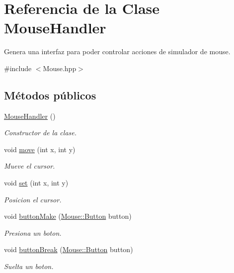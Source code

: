 \hypertarget{class_mouse_handler}{}\section{Referencia de la Clase Mouse\+Handler}
\label{class_mouse_handler}


Genera una interfaz para poder controlar acciones de simulador de mouse.  




{\ttfamily \#include $<$Mouse.\+hpp$>$}

\subsection*{Métodos públicos}
\begin{DoxyCompactItemize}
\item 
\hyperlink{class_mouse_handler_aeafc3781635558115e8188bbb7d976b5}{Mouse\+Handler} ()
\begin{DoxyCompactList}\small\item\em Constructor de la clase. \end{DoxyCompactList}\item 
void \hyperlink{class_mouse_handler_a042b5605fd58b89302d2f60edfc33d4d}{move} (int x, int y)
\begin{DoxyCompactList}\small\item\em Mueve el cursor. \end{DoxyCompactList}\item 
void \hyperlink{class_mouse_handler_a2d5711811aac4575f9e86181baa1798d}{set} (int x, int y)
\begin{DoxyCompactList}\small\item\em Posicion el cursor. \end{DoxyCompactList}\item 
void \hyperlink{class_mouse_handler_a739f9ffa963fbbafd89649c8df701cd4}{button\+Make} (\hyperlink{namespace_mouse_a2189c95ac90001266b97105c25085270}{Mouse\+::\+Button} button)
\begin{DoxyCompactList}\small\item\em Presiona un boton. \end{DoxyCompactList}\item 
void \hyperlink{class_mouse_handler_a3aa63ac9bfa2bb95222801ee31dfbbcc}{button\+Break} (\hyperlink{namespace_mouse_a2189c95ac90001266b97105c25085270}{Mouse\+::\+Button} button)
\begin{DoxyCompactList}\small\item\em Suelta un boton. \end{DoxyCompactList}\end{DoxyCompactItemize}


